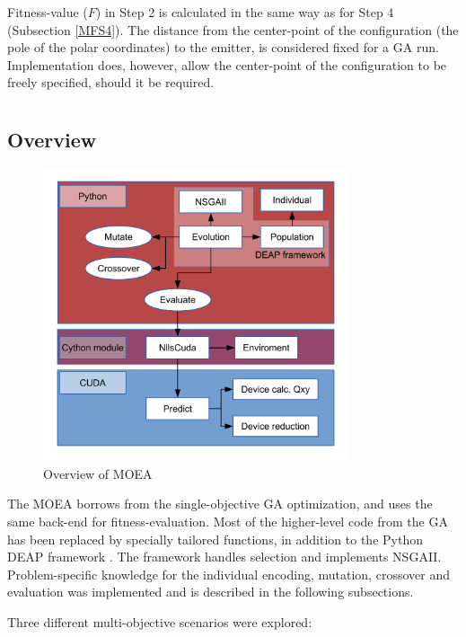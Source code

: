 \documentclass[10pt,a4paper]{book}
\begin{document}
Fitness-value ($F$) in Step 2 is calculated in the same way as for Step 4 (Subsection \ref{MFS4}).
The distance from the center-point of the configuration (the pole of the polar coordinates) to the emitter, is considered fixed for a \gls{GA} run. Implementation does, however, allow the center-point of the configuration to be freely specified, should it be required.


\newpage


\section{}

\subsection{Overview}

\begin{figure}[htp]
\centering
\includegraphics[width=90mm]{Moeaoverview.pdf}
\caption{Overview of \acrfull{MOEA}}
\label{overviewofmoea}
\end{figure}


The \gls{MOEA} borrows from the single-objective \gls{GA} optimization, and uses the same back-end for fitness-evaluation. Most of the higher-level code from the \gls{GA} has been replaced by specially tailored functions, in addition to the Python DEAP framework \cite{DEAP_JMLR2012}. The framework handles selection and implements NSGAII. Problem-specific knowledge for the individual encoding, mutation, crossover and evaluation was implemented and is described in the following subsections. 


Three different multi-objective scenarios were explored:
\end{document}
